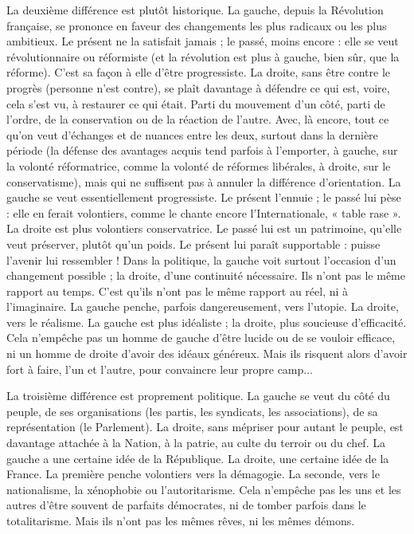 La deuxième différence est plutôt historique. La gauche, depuis la Révolution
française, se prononce en faveur des changements les plus radicaux ou les
plus ambitieux. Le présent ne la satisfait jamais ; le passé, moins encore : elle se
veut révolutionnaire ou réformiste (et la révolution est plus à gauche, bien sûr,
que la réforme). C’est sa façon à elle d’être progressiste. La droite, sans être
contre le progrès (personne n’est contre), se plaît davantage à défendre ce qui
est, voire, cela s’est vu, à restaurer ce qui était. Parti du mouvement d’un côté,
parti de l’ordre, de la conservation ou de la réaction de l’autre. Avec, là encore,
tout ce qu’on veut d'échanges et de nuances entre les deux, surtout dans la dernière
période (la défense des avantages acquis tend parfois à l'emporter, à
gauche, sur la volonté réformatrice, comme la volonté de réformes libérales, à
droite, sur le conservatisme), mais qui ne suffisent pas à annuler la différence
d'orientation. La gauche se veut essentiellement progressiste. Le présent
l’ennuie ; le passé lui pèse : elle en ferait volontiers, comme le chante encore
l’Internationale, « table rase ». La droite est plus volontiers conservatrice. Le
passé lui est un patrimoine, qu’elle veut préserver, plutôt qu’un poids. Le présent
lui paraît supportable : puisse l’avenir lui ressembler ! Dans la politique, la
gauche voit surtout l’occasion d’un changement possible ; la droite, d’une
continuité nécessaire. Ils n’ont pas le même rapport au temps. C’est qu’ils n’ont
pas le même rapport au réel, ni à l'imaginaire. La gauche penche, parfois dangereusement,
vers l’utopie. La droite, vers le réalisme. La gauche est plus
idéaliste ; la droite, plus soucieuse d’efficacité. Cela n’empêche pas un homme
de gauche d’être lucide ou de se vouloir efficace, ni un homme de droite d’avoir
des idéaux généreux. Mais ils risquent alors d’avoir fort à faire, l’un et l’autre,
pour convaincre leur propre camp...

La troisième différence est proprement politique. La gauche se veut du côté
du peuple, de ses organisations (les partis, les syndicats, les associations), de sa
représentation (le Parlement). La droite, sans mépriser pour autant le peuple,
est davantage attachée à la Nation, à la patrie, au culte du terroir ou du chef.
La gauche a une certaine idée de la République. La droite, une certaine idée de
la France. La première penche volontiers vers la démagogie. La seconde, vers le
nationalisme, la xénophobie ou l’autoritarisme. Cela n'empêche pas les uns et
les autres d’être souvent de parfaits démocrates, ni de tomber parfois dans le
totalitarisme. Mais ils n’ont pas les mêmes rêves, ni les mêmes démons.

